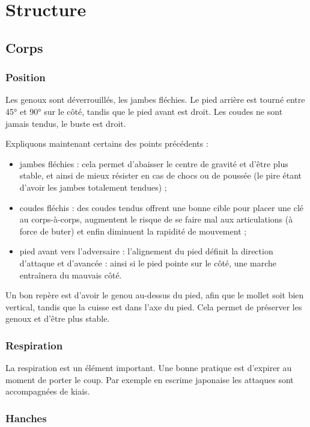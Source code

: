 \chapter{Structure}


\section{Corps}

\subsection{Position}

Les genoux sont déverrouillés, les jambes fléchies.
Le pied arrière est tourné entre 45° et 90° sur le côté, tandis que le pied avant est droit.
Les coudes ne sont jamais tendus, le buste est droit.

Expliquons maintenant certains des points précédents :
\begin{itemize}
	\item jambes fléchies : cela permet d'abaisser le centre de gravité et d'être plus stable, et ainsi de mieux résister en cas de chocs ou de poussée (le pire étant d'avoir les jambes totalement tendues) ;
	\item coudes fléchis : des coudes tendus offrent une bonne cible pour placer une clé au corps-à-corps, augmentent le risque de se faire mal aux articulations (à force de buter) et enfin diminuent la rapidité de mouvement ;
	\item pied avant vers l'adversaire : l'alignement du pied définit la direction d'attaque et d'avancée : ainsi si le pied pointe sur le côté, une marche entraînera du mauvais côté.
\end{itemize}

Un bon repère est d'avoir le genou au-dessus du pied, afin que le mollet soit bien vertical, tandis que la cuisse est dans l'axe du pied.
Cela permet de préserver les genoux et d'être plus stable.


\subsection{Respiration}

La respiration est un élément important.
Une bonne pratique est d'expirer au moment de porter le coup.
Par exemple en escrime japonaise les attaques sont accompagnées de kiais.


\subsection{Hanches}

